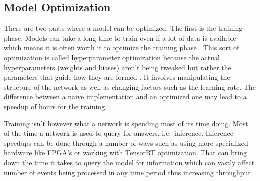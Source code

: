 \subsection{Model Optimization}

There are two parts where a model can be optimized.
The first is the training phase.
Models can take a long time to train even if a lot of data is available which means it is often worth it to optimize the training phase \cite{Vapnik_1999}.
This sort of optimization is called hyperparameter optimization because the actual hyperparameters (weights and biases) aren't being tweaked but rather the parameters that guide how they are formed \cite{Zell_1997}.
It involves manipulating the structure of the network as well as changing factors such as the learning rate.
The difference between a naive implementation and an optimized one may lead to a speedup of hours for the training.

Training isn't however what a network is spending most of its time doing.
Most of the time a network is used to query for answers, i.e.\ inference.
Inference speedups can be done through a number of ways such as using more specialized hardware like FPGA's or working with TensorRT optimization.
That can bring down the time it takes to query the model for information which can vastly affect number of events being processed in any time period thus increasing throughput \cite{MacKay_2019}.







